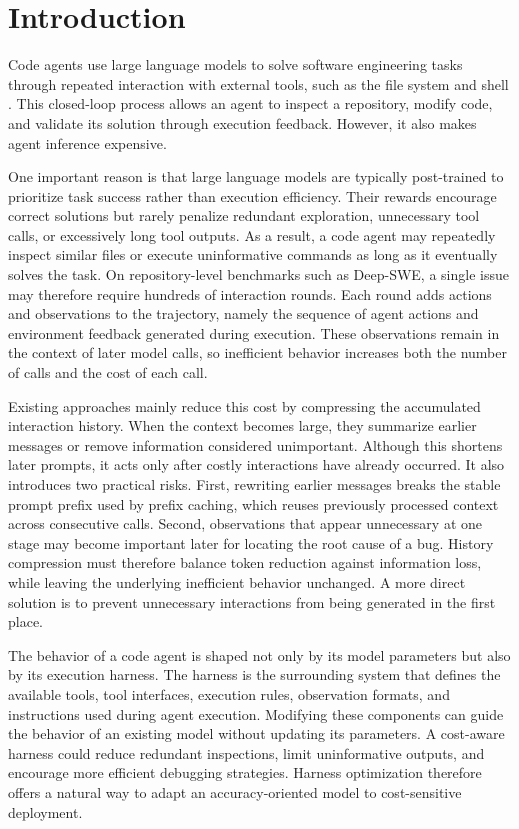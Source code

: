 \section{Introduction}
\label{sec:introduction}

Code agents use large language models to solve software engineering tasks through repeated interaction with external tools, such as the file system and shell \citep{yao2023react,yang2024sweagent}. This closed-loop process allows an agent to inspect a repository, modify code, and validate its solution through execution feedback. However, it also makes agent inference expensive.

One important reason is that large language models are typically post-trained to prioritize task success rather than execution efficiency. Their rewards encourage correct solutions but rarely penalize redundant exploration, unnecessary tool calls, or excessively long tool outputs. As a result, a code agent may repeatedly inspect similar files or execute uninformative commands as long as it eventually solves the task. On repository-level benchmarks such as Deep-SWE, a single issue may therefore require hundreds of interaction rounds. Each round adds actions and observations to the trajectory, namely the sequence of agent actions and environment feedback generated during execution. These observations remain in the context of later model calls, so inefficient behavior increases both the number of calls and the cost of each call.

Existing approaches mainly reduce this cost by compressing the accumulated interaction history. When the context becomes large, they summarize earlier messages or remove information considered unimportant. Although this shortens later prompts, it acts only after costly interactions have already occurred. It also introduces two practical risks. First, rewriting earlier messages breaks the stable prompt prefix used by prefix caching, which reuses previously processed context across consecutive calls. Second, observations that appear unnecessary at one stage may become important later for locating the root cause of a bug. History compression must therefore balance token reduction against information loss, while leaving the underlying inefficient behavior unchanged. A more direct solution is to prevent unnecessary interactions from being generated in the first place.

The behavior of a code agent is shaped not only by its model parameters but also by its execution harness. The harness is the surrounding system that defines the available tools, tool interfaces, execution rules, observation formats, and instructions used during agent execution. Modifying these components can guide the behavior of an existing model without updating its parameters. A cost-aware harness could reduce redundant inspections, limit uninformative outputs, and encourage more efficient debugging strategies. Harness optimization therefore offers a natural way to adapt an accuracy-oriented model to cost-sensitive deployment.


